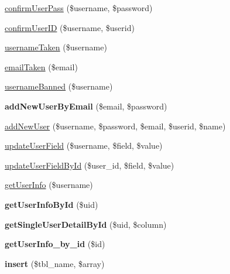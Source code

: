 \begin{DoxyCompactItemize}
\item 
\hyperlink{class_my_s_q_l_d_b_a42a4e4b38753b843daedf57c869c9dd7}{confirm\-User\-Pass} (\$username, \$password)
\item 
\hyperlink{class_my_s_q_l_d_b_aeca58a2a3a01b702e8a785c4736139d0}{confirm\-User\-I\-D} (\$username, \$userid)
\item 
\hyperlink{class_my_s_q_l_d_b_a9f8fc182b096367bb7ca48fd2bb07e8c}{username\-Taken} (\$username)
\item 
\hyperlink{class_my_s_q_l_d_b_a0be28f19d074f642e8984657f8c019d2}{email\-Taken} (\$email)
\item 
\hyperlink{class_my_s_q_l_d_b_a899be83fb1ee29d41d499b27c2f58d28}{username\-Banned} (\$username)
\item 
\hypertarget{class_my_s_q_l_d_b_af258af33348068d005fe00c42a331937}{{\bfseries add\-New\-User\-By\-Email} (\$email, \$password)}\label{class_my_s_q_l_d_b_af258af33348068d005fe00c42a331937}

\item 
\hyperlink{class_my_s_q_l_d_b_aeeede6b869558edb7fe3d930c9a00a5f}{add\-New\-User} (\$username, \$password, \$email, \$userid, \$name)
\item 
\hyperlink{class_my_s_q_l_d_b_a76db94ff6bb9f20b1d2a8142c7c051fc}{update\-User\-Field} (\$username, \$field, \$value)
\item 
\hyperlink{class_my_s_q_l_d_b_ab6bf90ac289c0b5f63029cd66e50d06d}{update\-User\-Field\-By\-Id} (\$user\-\_\-id, \$field, \$value)
\item 
\hyperlink{class_my_s_q_l_d_b_af65b3cbfac51b0a0b8631c1d2d6f0d07}{get\-User\-Info} (\$username)
\item 
\hypertarget{class_my_s_q_l_d_b_abdf8981ed4171897639428ea5ceec199}{{\bfseries get\-User\-Info\-By\-Id} (\$uid)}\label{class_my_s_q_l_d_b_abdf8981ed4171897639428ea5ceec199}

\item 
\hypertarget{class_my_s_q_l_d_b_a9e0f480361df5f7d6cc343d79e3e02a6}{{\bfseries get\-Single\-User\-Detail\-By\-Id} (\$uid, \$column)}\label{class_my_s_q_l_d_b_a9e0f480361df5f7d6cc343d79e3e02a6}

\item 
\hypertarget{class_my_s_q_l_d_b_aa6e4407bed217937e60ec67588c4c9e2}{{\bfseries get\-User\-Info\-\_\-by\-\_\-id} (\$id)}\label{class_my_s_q_l_d_b_aa6e4407bed217937e60ec67588c4c9e2}

\item 
\hypertarget{class_my_s_q_l_d_b_a56f831280ec13f56be167360f901fb27}{{\bfseries insert} (\$tbl\-\_\-name, \$array)}\label{class_my_s_q_l_d_b_a56f831280ec13f56be167360f901fb27}


\end{DoxyCompactItemize}
